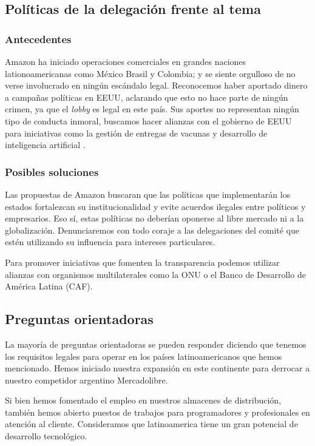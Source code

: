 \documentclass[11pt,a4paper]{article}
\begin{document}
\subsection{Políticas de la delegación frente al tema}

\subsubsection{Antecedentes}

\noindent Amazon ha iniciado operaciones comerciales en grandes naciones lationoamericanas como México Brasil y Colombia; y se siente orgulloso de no verse involucrado en ningún escándalo legal. Reconocemos haber aportado dinero a campañas políticas en EEUU, aclarando que esto no hace parte de ningún crimen, ya que el \textit{lobby} es legal en este país. Sus aportes no representan ningún tipo de conducta inmoral, buscamos hacer alianzas con el gobierno de EEUU para iniciativas como la gestión de entregas de vacunas y desarrollo de inteligencia artificial \cite{lo}.

\subsubsection{Posibles soluciones}

\noindent Las propuestas de Amazon buscaran que las políticas que implementarán los estados fortalezcan su institucionalidad y evite acuerdos ilegales entre políticos y empresarios. Eso sí, estas políticas no deberían oponerse al libre mercado ni a la globalización. Denunciaremos con todo coraje a las delegaciones del comité que estén utilizando su influencia para intereses particulares. 

Para promover iniciativas que fomenten la transparencia  podemos utilizar alianzas con organismos multilaterales como la ONU o el Banco de Desarrollo de América Latina (CAF).

\subsection{Preguntas orientadoras}

\noindent La mayoría de preguntas orientadoras se pueden responder diciendo que tenemos los requisitos legales para operar en los países latinoamericanos que hemos mencionado. Hemos iniciado nuestra expansión en este continente para derrocar a nuestro competidor argentino Mercadolibre. 

Si bien hemos fomentado el empleo en nuestros almacenes de distribución, también hemos abierto puestos de trabajos para programadores y profesionales en atención al cliente. Consideramos que latinoamerica tiene un gran potencial de desarrollo tecnológico. 
\end{document}
